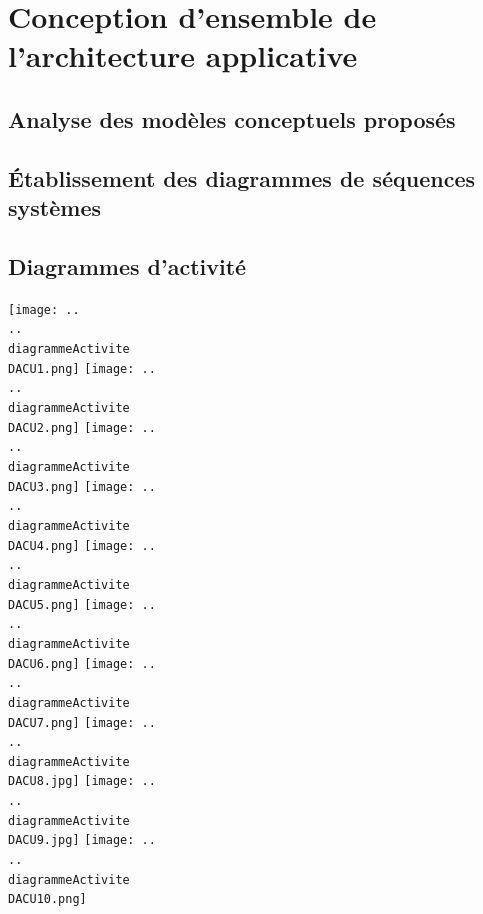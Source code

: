 

\section{Conception d'ensemble de l'architecture applicative}

\subsection{Analyse des modèles conceptuels proposés}

\subsection{Établissement des diagrammes de séquences systèmes}

\subsection{Diagrammes d'activité}

\begin {center}
\texttt{[image: ..\\..\\diagrammeActivite\\DACU1.png]}
\texttt{[image: ..\\..\\diagrammeActivite\\DACU2.png]}
\texttt{[image: ..\\..\\diagrammeActivite\\DACU3.png]}
\texttt{[image: ..\\..\\diagrammeActivite\\DACU4.png]}
\texttt{[image: ..\\..\\diagrammeActivite\\DACU5.png]}
\texttt{[image: ..\\..\\diagrammeActivite\\DACU6.png]}
\texttt{[image: ..\\..\\diagrammeActivite\\DACU7.png]}
\texttt{[image: ..\\..\\diagrammeActivite\\DACU8.jpg]}
\texttt{[image: ..\\..\\diagrammeActivite\\DACU9.jpg]}
\texttt{[image: ..\\..\\diagrammeActivite\\DACU10.png]}
\end {center}

